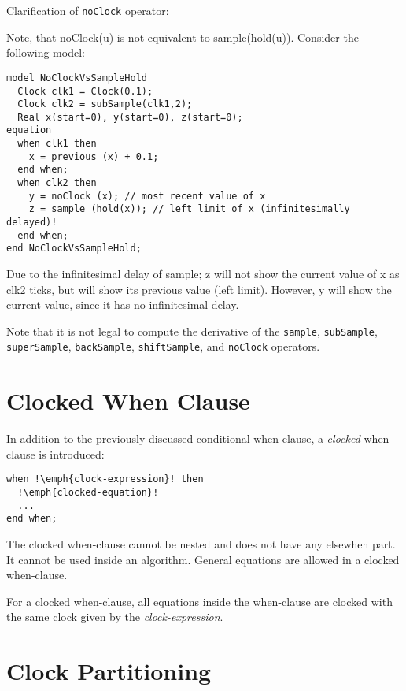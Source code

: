 \begin{nonnormative}
Clarification of \lstinline!noClock! operator:

Note, that noClock(u) is not equivalent to sample(hold(u)).  Consider the following model:
\begin{lstlisting}[language=modelica]
model NoClockVsSampleHold
  Clock clk1 = Clock(0.1);
  Clock clk2 = subSample(clk1,2);
  Real x(start=0), y(start=0), z(start=0);
equation
  when clk1 then
    x = previous (x) + 0.1;
  end when;
  when clk2 then
    y = noClock (x); // most recent value of x
    z = sample (hold(x)); // left limit of x (infinitesimally delayed)!
  end when;
end NoClockVsSampleHold;
\end{lstlisting}

Due to the infinitesimal delay of sample; z will not show the current value of x as clk2 ticks, but will show its previous value (left limit). However, y will show
the current value, since it has no infinitesimal delay.
\end{nonnormative}

Note that it is not legal to compute the derivative of the \lstinline!sample!, \lstinline!subSample!, \lstinline!superSample!, \lstinline!backSample!,
\lstinline!shiftSample!, and \lstinline!noClock! operators.

\section{Clocked When Clause}\label{clocked-when-clause}

In addition to the previously discussed conditional when-clause, a
\emph{clocked} when-clause is introduced:
\begin{lstlisting}[language=modelica,escapechar=!]
when !\emph{clock-expression}! then
  !\emph{clocked-equation}!
  ...
end when;
\end{lstlisting}

The clocked when-clause cannot be nested and does not have any elsewhen
part. It cannot be used inside an algorithm. General equations are
allowed in a clocked when-clause.

For a clocked when-clause, all equations inside the when-clause are
clocked with the same clock given by the \emph{clock-expression}.

\section{Clock Partitioning}\label{clock-partitioning}

